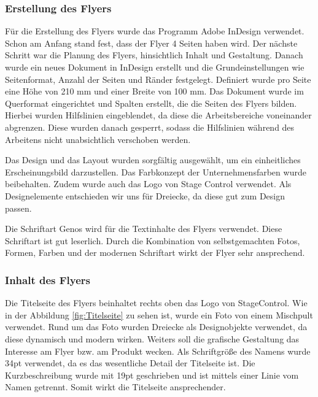 \newpage
\subsubsection{Erstellung des Flyers}
Für die Erstellung des Flyers wurde das Programm Adobe InDesign verwendet. Schon am Anfang stand fest, dass der Flyer 4 Seiten haben wird. Der nächste Schritt war die Planung des Flyers, hinsichtlich Inhalt und Gestaltung. Danach wurde ein neues Dokument in InDesign erstellt und die Grundeinstellungen wie Seitenformat, Anzahl der Seiten und Ränder festgelegt. Definiert wurde pro Seite eine Höhe von 210 mm und einer Breite von 100 mm. Das Dokument wurde im Querformat eingerichtet und Spalten erstellt, die die Seiten des Flyers bilden. Hierbei wurden Hilfslinien eingeblendet, da diese die Arbeitsbereiche voneinander abgrenzen. Diese wurden danach gesperrt, sodass die Hilfslinien während des Arbeitens nicht unabsichtlich verschoben werden. 

Das Design und das Layout wurden sorgfältig ausgewählt, um ein einheitliches Erscheinungsbild darzustellen. Das Farbkonzept der Unternehmensfarben wurde beibehalten. Zudem wurde auch das Logo von Stage Control verwendet. Als Designelemente entschieden wir uns für Dreiecke, da diese gut zum Design passen. 

Die Schriftart Genos wird für die Textinhalte des Flyers verwendet. Diese Schriftart ist gut leserlich. Durch die Kombination von selbstgemachten Fotos, Formen, Farben und der modernen Schriftart wirkt der Flyer sehr ansprechend. 

\newpage
\subsubsection{Inhalt des Flyers}
Die Titelseite des Flyers beinhaltet rechts oben das Logo von StageControl. Wie in der Abbildung \ref{fig:Titelseite} zu sehen ist, wurde ein Foto von einem Mischpult verwendet. Rund um das Foto wurden Dreiecke als Designobjekte verwendet, da diese dynamisch und modern wirken. Weiters soll die grafische Gestaltung das Interesse am Flyer bzw. am Produkt wecken. 
Als Schriftgröße des Namens wurde 34pt verwendet, da es das wesentliche Detail der Titelseite ist. Die Kurzbeschreibung wurde mit 19pt geschrieben und ist mittels einer Linie vom Namen getrennt. Somit wirkt die Titelseite ansprechender.

